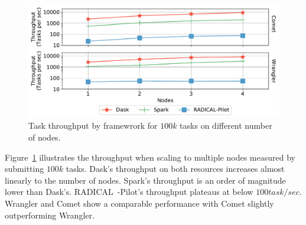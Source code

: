 \begin{figure}[t]
    \includegraphics[width=.95\textwidth]{figures/data_analytics_hpc/task_par/daskVSsparkVSRpThroughput.pdf}
    \caption{Task throughput by framewrork for $100k$ tasks on different number of nodes.}
    \label{fig:RP_Dask_Spark_throughput}
\end{figure}

Figure~\ref{fig:RP_Dask_Spark_throughput} illustrates the throughput when scaling to multiple nodes measured by submitting $100k$ tasks.
Dask's throughput on both resources increases almost linearly to the number of nodes.
Spark's throughput is an order of magnitude lower than Dask's.
RADICAL~-Pilot's throughput plateaus at below $100 task/sec$.
Wrangler and Comet show a comparable performance with Comet slightly outperforming Wrangler.



